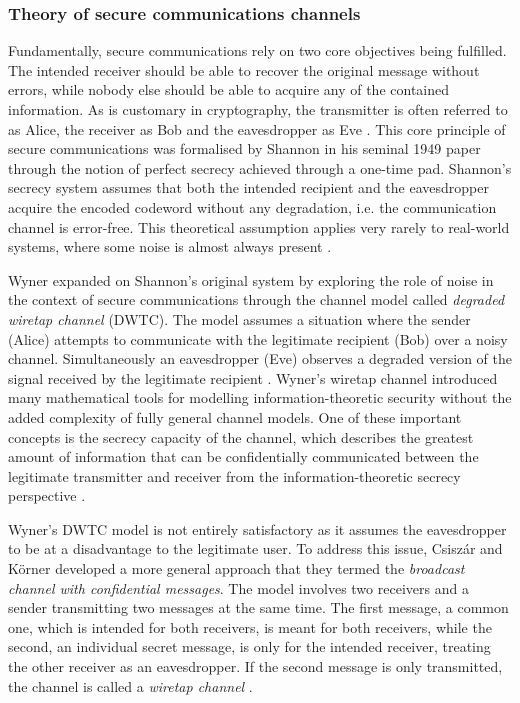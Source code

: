 \documentclass[english, 12pt, a4paper, elec, utf8, a-1b, online]{aaltothesis}
\begin{document}
\subsubsection{Theory of secure communications channels}
Fundamentally, secure communications rely on two core objectives being fulfilled.
The intended receiver should be able to recover the original message without errors, while nobody else should be able to acquire any of the contained information.
As is customary in cryptography, the transmitter is often referred to as Alice, the receiver as Bob and the eavesdropper as Eve \cite{bloch2011physical}.
This core principle of secure communications was formalised by Shannon \cite{shannon1949communication} in his seminal 1949 paper through the notion of perfect secrecy achieved through a one-time pad.
Shannon's secrecy system assumes that both the intended recipient and the eavesdropper acquire the encoded codeword without any degradation, i.e. the communication channel is error-free.
This theoretical assumption applies very rarely to real-world systems, where some noise is almost always present \cite{bloch2011physical}.

Wyner \cite{wyner1975thewiretap} expanded on Shannon's original system by exploring the role of noise in the context of secure communications through the channel model called \textit{degraded wiretap channel} (DWTC).
The model assumes a situation where the sender (Alice) attempts to communicate with the legitimate recipient (Bob) over a noisy channel.
Simultaneously an eavesdropper (Eve) observes a degraded version of the signal received by the legitimate recipient \cite{barros2006secrecy}.
Wyner's wiretap channel introduced many mathematical tools for modelling information-theoretic security without the added complexity of fully general channel models.
One of these important concepts is the secrecy capacity of the channel, which describes the greatest amount of information that can be confidentially communicated between the legitimate transmitter and receiver from the information-theoretic secrecy perspective \cite{bloch2011physical}.

Wyner's DWTC model is not entirely satisfactory as it assumes the eavesdropper to be at a disadvantage to the legitimate user. To address this issue, Csiszár and Körner \cite{csiszar1978broadcast} developed a more general approach that they termed the \textit{broadcast channel with confidential messages}.
The model involves two receivers and a sender transmitting two messages at the same time.
The first message, a common one, which is intended for both receivers, is meant for both receivers, while the second, an individual secret message, is only for the intended receiver, treating the other receiver as an eavesdropper.
If the second message is only transmitted, the channel is called a \textit{wiretap channel} \cite{bloch2011physical}.
\end{document}
